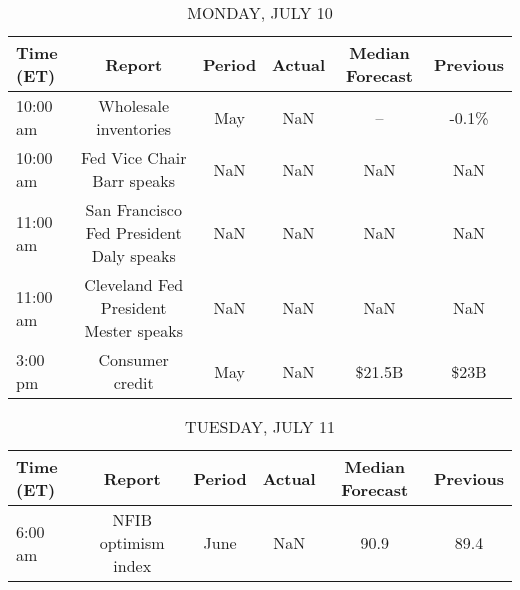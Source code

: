 \documentclass{article}%
\begin{document}
%
\normalsize%


\begin{table}[htbp]%
\caption{MONDAY, JULY 10}%
\centering%
\begin{adjustbox}{width=1\textwidth}%
\begin{tabular}{lccccc}
\toprule
Time (ET) &                                  Report & Period & Actual & Median Forecast & Previous \\
\midrule
 10:00 am &                   Wholesale inventories &    May &    NaN &              -- &    -0.1\% \\
 10:00 am &              Fed Vice Chair Barr speaks &    NaN &    NaN &             NaN &      NaN \\
 11:00 am & San Francisco Fed President Daly speaks &    NaN &    NaN &             NaN &      NaN \\
 11:00 am &   Cleveland Fed President Mester speaks &    NaN &    NaN &             NaN &      NaN \\
  3:00 pm &                         Consumer credit &    May &    NaN &          \$21.5B &     \$23B \\
\bottomrule
\end{tabular}
%
\end{adjustbox}%
\end{table}

%


\begin{table}[htbp]%
\caption{TUESDAY, JULY 11}%
\centering%
\begin{adjustbox}{width=1\textwidth}%
\begin{tabular}{lccccc}
\toprule
Time (ET) &              Report & Period & Actual & Median Forecast & Previous \\
\midrule
  6:00 am & NFIB optimism index &   June &    NaN &            90.9 &     89.4 \\
\bottomrule
\end{tabular}
%
\end{adjustbox}%
\end{table}

%
\end{document}
